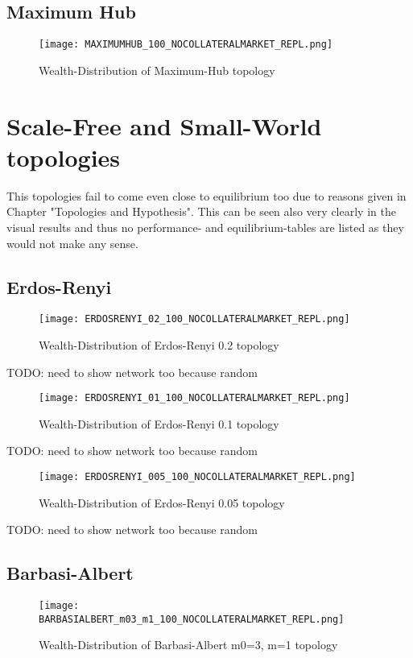\documentclass[Bachelorarbeit.tex]{subfiles}
\begin{document}
\subsection{Maximum Hub}
\begin{figure}[H]
	\centering
  \texttt{[image: MAXIMUMHUB\_100\_NOCOLLATERALMARKET\_REPL.png]}
	\caption{Wealth-Distribution of Maximum-Hub topology}
	\label{fig1}
\end{figure}

\section{Scale-Free and Small-World topologies}
This topologies fail to come even close to equilibrium too due to reasons given in Chapter "Topologies and Hypothesis". This can be seen also very clearly in the visual results and thus no performance- and equilibrium-tables are listed as they would not make any sense.

\subsection{Erdos-Renyi}
\begin{figure}[H]
	\centering
  \texttt{[image: ERDOSRENYI\_02\_100\_NOCOLLATERALMARKET\_REPL.png]}
	\caption{Wealth-Distribution of Erdos-Renyi 0.2 topology}
	\label{fig1}
\end{figure}

TODO: need to show network too because random

\begin{figure}[H]
	\centering
  \texttt{[image: ERDOSRENYI\_01\_100\_NOCOLLATERALMARKET\_REPL.png]}
	\caption{Wealth-Distribution of Erdos-Renyi 0.1 topology}
	\label{fig1}
\end{figure}

TODO: need to show network too because random

\begin{figure}[H]
	\centering
  \texttt{[image: ERDOSRENYI\_005\_100\_NOCOLLATERALMARKET\_REPL.png]}
	\caption{Wealth-Distribution of Erdos-Renyi 0.05 topology}
	\label{fig1}
\end{figure}

TODO: need to show network too because random

\subsection{Barbasi-Albert}
\begin{figure}[H]
	\centering
  \texttt{[image: BARBASIALBERT\_m03\_m1\_100\_NOCOLLATERALMARKET\_REPL.png]}
	\caption{Wealth-Distribution of Barbasi-Albert m0=3, m=1 topology}
	\label{fig1}
\end{figure}
\end{document}
